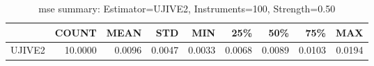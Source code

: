 \begin{table}[ht]
\centering
\caption{mse summary: Estimator=UJIVE2, Instruments=100, Strength=0.50}
\begin{tabular}{lrrrrrrrr}
\toprule
 & COUNT & MEAN & STD & MIN & 25\% & 50\% & 75\% & MAX \\
\midrule
UJIVE2 & 10.0000 & 0.0096 & 0.0047 & 0.0033 & 0.0068 & 0.0089 & 0.0103 & 0.0194 \\
\bottomrule
\end{tabular}
\end{table}
